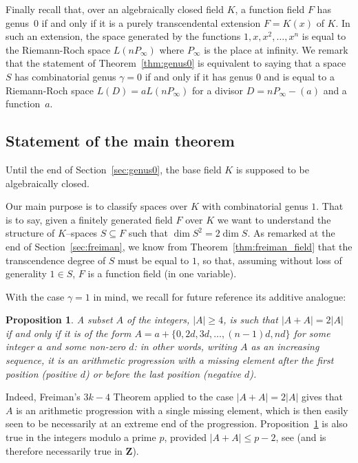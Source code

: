 \documentclass{article}
\theoremstyle{plain}
\newtheorem{prop}[thm]{Proposition}
\theoremstyle{definition}
\theoremstyle{remark}
\def\Z{{\mathbf Z}}
\renewcommand{\geq}{\geqslant}
\renewcommand{\leq}{\leqslant}
\begin{document}
Finally recall that, {over an algebraically closed field $K$}, a function field $F$ has genus~$0$ if and only if
it is a purely transcendental extension $F=K(x)$ of $K$. In such an
extension, the space generated by the functions $1,x,x^2,\ldots ,x^n$ is
equal to the Riemann-Roch space $L(nP_\infty)$ where $P_\infty$ is the
place at infinity.
We remark that the statement of Theorem~\ref{thm:genus0} is
equivalent to saying that a space $S$ has combinatorial genus $\gamma=0$ if
and only if it has genus $0$ and is equal to a Riemann-Roch space
$L(D)=aL(nP_\infty)$ for a divisor $D=nP_\infty-(a)$ and a function~$a$. 


\subsection{Statement of the main theorem}
\label{sec:Vosper+1}
 { Until the end of Section~\ref{sec:genus0}, the base field
 $K$ is supposed to be algebraically closed.}

 Our main purpose is to
classify spaces over $K$ with combinatorial genus $1$.  That is to say, given a
finitely generated field $F$ over $K$ we want to understand the structure
of $K$--spaces $S \subseteq F$ such that $\dim S^2 = 2 \dim S$.
As remarked at the end of Section~\ref{sec:freiman}, we know from
Theorem~\ref{thm:freiman_field} that the
transcendence degree of $S$ must be equal to $1$, so that, assuming without
loss of generality $1\in S$, $F$ is a function field (in one
variable). 

With the case $\gamma=1$ in mind, we recall for future reference
its additive analogue:
\begin{prop}\label{prop:A+A=2A}
  A subset $A$ of the integers, $|A|\geq 4$, is such that $|A+A|=2|A|$ if and only
  if it is of the form $A=a+\{0,2d,3d,\ldots ,(n-1)d,nd\}$ for some
  {integer $a$ and some}
  non-zero $d$: in other words, writing $A$ as an increasing sequence, 
  it is an arithmetic
  progression with a missing element after the first position
  (positive $d$) or before the last position (negative $d$).
\end{prop}
Indeed, Freiman's $3k-4$ Theorem applied to the case $|A+A|=2|A|$
gives that $A$ is an arithmetic progression with a single missing
element, which is then easily seen to be necessarily at an extreme end
of the progression. 
{
Proposition~\ref{prop:A+A=2A} is also true in the
integers modulo a prime $p$, provided $|A+A|\leq p-2$, see \cite{hr00}
(and is therefore necessarily true in $\Z$).
}
\end{document}
